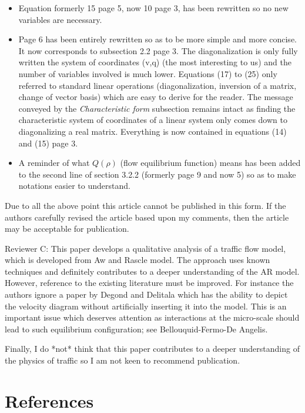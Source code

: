 \documentclass{article}
\begin{document}
\begin{itemize}
\item Equation formerly 15 page 5, now 10 page 3, has been rewritten so no new variables are necessary.
\item Page 6 has been entirely rewritten so as to be more simple and more concise. It now corresponds to subsection 2.2 page 3. The diagonalization is only fully written the system of coordinates (v,q) (the most interesting to us) and the number of variables involved is much lower. Equations (17) to (25) only referred to standard linear operations (diagonalization, inversion of a matrix, change of vector basis) which are easy to derive for the reader. The message conveyed by the \textit{Characteristic form} subsection remains intact as finding the characteristic system of coordinates of a linear system only comes down to diagonalizing a real matrix. Everything is now contained in equations (14) and (15) page 3.
\item A reminder of what $Q(\rho)$ (flow equilibrium function) means has been added to the second line of section 3.2.2 (formerly page 9 and now 5) so as to make notations easier to understand.
\end{itemize}

\bigskip{}

Due to all the above point this article cannot be published in this form. If the authors carefully revised the article based upon my comments, then the article may be acceptable for publication.




\newpage

Reviewer C: This paper develops a qualitative analysis of a traffic flow model, which is developed from Aw and Rascle model. The approach uses known techniques and definitely contributes to a deeper understanding of the AR model. However, reference to the existing literature must be improved. For instance the authors ignore a paper by Degond and Delitala which has the ability to depict the velocity diagram without artificially inserting it into the model. This is an important issue which deserves attention as interactions at the micro-scale should lead to such equilibrium configuration; see Bellouquid-Fermo-De Angelis.

Finally, I do *not* think that this paper contributes to a deeper understanding of the physics of traffic so I am not keen to recommend publication.

\section*{References}

\end{document}

